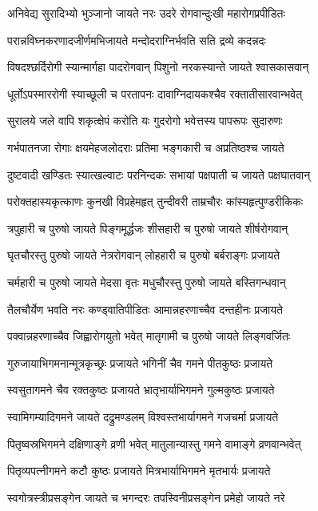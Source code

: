 \twolineshloka
{अनिवेद्य सुरादिभ्यो भुञ्जानो जायते नरः}
{उदरे रोगवान्दुःखी महारोगप्रपीडितः}%

\twolineshloka
{परान्नविघ्नकरणादजीर्णमभिजायते}
{मन्दोदराग्निर्भवति सति द्रव्ये कदन्नदः}%

\twolineshloka
{विषदश्छर्दिरोगी स्यान्मार्गहा पादरोगवान्}
{पिशुनो नरकस्यान्ते जायते श्वासकासवान्}%

\twolineshloka
{धूर्तोऽपस्माररोगी स्याच्छूली च परतापनः}
{दावाग्निदायकश्चैव रक्तातीसारवान्भवेत्}%

\twolineshloka
{सुरालये जले वापि शकृत्क्षेपं करोति यः}
{गुदरोगो भवेत्तस्य पापरूपः सुदारुणः}%

\twolineshloka
{गर्भपातनजा रोगाः क्षयमेहजलोदराः}
{प्रतिमा भङ्गकारी च अप्रतिष्ठश्च जायते}%

\twolineshloka
{दुष्टवादी खण्डितः स्यात्खल्वाटः परनिन्दकः}
{सभायां पक्षपाती च जायते पक्षघातवान्}%

\twolineshloka
{परोक्तहास्यकृत्काणः कुनखी विप्रहेमहृत्}
{तुन्दीवरी ताम्रचौरः कांस्यहृत्पुण्डरीकिकः}%

\twolineshloka
{त्रपुहारी च पुरुषो जायते पिङ्गमूर्द्धजः}
{शीसहारी च पुरुषो जायते शीर्षरोगवान्}%

\twolineshloka
{घृतचौरस्तु पुरुषो जायते नेत्ररोगवान्}
{लोहहारी च पुरुषो बर्बराङ्गः प्रजायते}%

\twolineshloka
{चर्महारी च पुरुषो जायते मेदसा वृतः}
{मधुचौरस्तु पुरुषो जायते बस्तिगन्धवान्}%

\twolineshloka
{तैलचौर्येण भवति नरः कण्ड्वातिपीडितः}
{आमान्नहरणाच्चैव दन्तहीनः प्रजायते}%

\twolineshloka
{पक्वान्नहरणाच्चैव जिह्वारोगयुतो भवेत्}
{मातृगामी च पुरुषो जायते लिङ्गवर्जितः}%

\twolineshloka
{गुरुजायाभिगमनान्मूत्रकृच्छ्रः प्रजायते}
{भगिनीं चैव गमने पीतकुष्ठः प्रजायते}%

\twolineshloka
{स्वसुतागमने चैव रक्तकुष्ठः प्रजायते}
{भ्रातृभार्याभिगमने गुल्मकुष्ठः प्रजायते}%

\twolineshloka
{स्वामिगम्यादिगमने जायते दद्रुमण्डलम्}
{विश्वस्तभार्यागमने गजचर्मा प्रजायते}%

\twolineshloka
{पितृष्वस्रभिगमने दक्षिणाङ्गे व्रणी भवेत्}
{मातुलान्यास्तु गमने वामाङ्गे व्रणवान्भवेत्}%

\twolineshloka
{पितृव्यपत्नीगमने कटौ कुष्ठः प्रजायते}
{मित्रभार्याभिगमने मृतभार्यः प्रजायते}%

\twolineshloka
{स्वगोत्रस्त्रीप्रसङ्गेन जायते च भगन्दरः}
{तपस्विनीप्रसङ्गेन प्रमेहो जायते नरे}%


